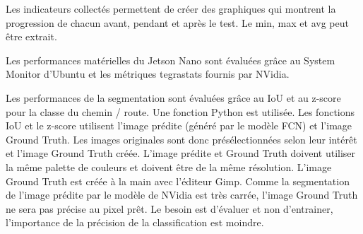 \par Les indicateurs collectés permettent de créer des graphiques qui montrent la progression de chacun avant, pendant et après le test.  Le min, max et avg peut être extrait.
\par Les performances matérielles du Jetson Nano sont évaluées grâce au System Monitor d’Ubuntu et les métriques tegrastats fournis par NVidia.
\par Les performances de la segmentation sont évaluées grâce au IoU et au z-score pour la classe du chemin / route. Une fonction Python est utilisée. Les fonctions IoU et le z-score utilisent l'image prédite (généré par le modèle FCN) et l'image Ground Truth. Les images originales sont donc présélectionnées selon leur intérêt et l'image Ground Truth créée. L'image prédite et Ground Truth doivent utiliser la même palette de couleurs et doivent être de la même résolution. 
L'image Ground Truth est créée à la main avec l'éditeur Gimp. Comme la segmentation de l'image prédite par le modèle de NVidia est très carrée, l'image Ground Truth ne sera pas précise au pixel prêt. Le besoin est d'évaluer et non d'entrainer, l'importance de la précision de la classification est moindre. 
